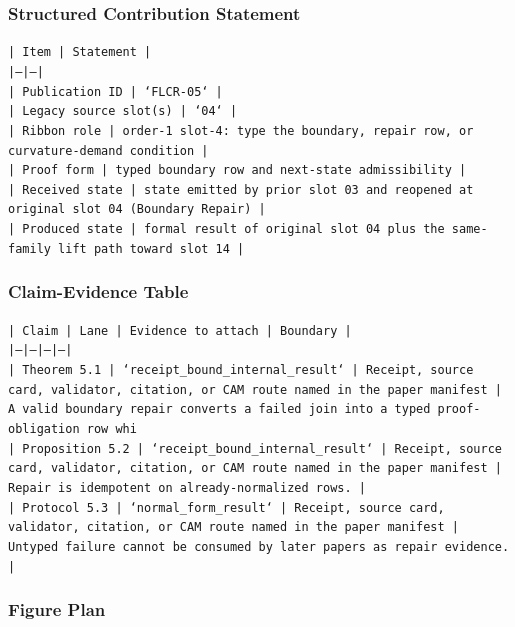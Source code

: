 \documentclass[11pt]{article}
\begin{document}
\subsubsection*{Structured Contribution Statement}

\noindent\texttt{| Item | Statement |}\\
\noindent\texttt{|---|---|}\\
\noindent\texttt{| Publication ID | `FLCR-05` |}\\
\noindent\texttt{| Legacy source slot(s) | `04` |}\\
\noindent\texttt{| Ribbon role | order-1 slot-4: type the boundary, repair row, or curvature-demand condition |}\\
\noindent\texttt{| Proof form | typed boundary row and next-state admissibility |}\\
\noindent\texttt{| Received state | state emitted by prior slot 03 and reopened at original slot 04 (Boundary Repair) |}\\
\noindent\texttt{| Produced state | formal result of original slot 04 plus the same-family lift path toward slot 14 |}\\

\subsubsection*{Claim-Evidence Table}

\noindent\texttt{| Claim | Lane | Evidence to attach | Boundary |}\\
\noindent\texttt{|---|---|---|---|}\\
\noindent\texttt{| Theorem 5.1 | `receipt\_bound\_internal\_result` | Receipt, source card, validator, citation, or CAM route named in the paper manifest | A valid boundary repair converts a failed join into a typed proof-obligation row whi}\\
\noindent\texttt{| Proposition 5.2 | `receipt\_bound\_internal\_result` | Receipt, source card, validator, citation, or CAM route named in the paper manifest | Repair is idempotent on already-normalized rows. |}\\
\noindent\texttt{| Protocol 5.3 | `normal\_form\_result` | Receipt, source card, validator, citation, or CAM route named in the paper manifest | Untyped failure cannot be consumed by later papers as repair evidence. |}\\

\subsubsection*{Figure Plan}
\end{document}
